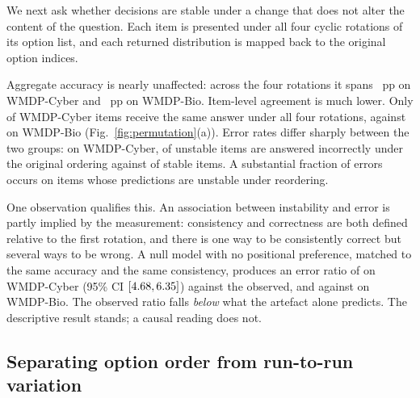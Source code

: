 \documentclass[conference,compsoc]{IEEEtran}
\begin{document}
We next ask whether decisions are stable under a change that does not alter the content of
the question. Each item is presented under all four cyclic rotations of its option list, and
each returned distribution is mapped back to the original option indices.

Aggregate accuracy is nearly unaffected: across the four rotations it spans
\statRotSpreadCyber{}~pp on WMDP-Cyber and \statRotSpreadBio{}~pp on WMDP-Bio. Item-level
agreement is much lower. Only \statConsistCyber{} of WMDP-Cyber items receive the same answer
under all four rotations, against \statConsistBio{} on WMDP-Bio
(Fig.~\ref{fig:permutation}(a)). Error rates differ sharply between the two groups: on
WMDP-Cyber, \statErrUnstableCyber{} of unstable items are answered incorrectly under the
original ordering against \statErrStableCyber{} of stable items. A substantial fraction of errors occurs on items whose predictions are unstable under
reordering.

One observation qualifies this. An association between instability and error is partly
implied by the measurement: consistency and correctness are both defined relative to the
first rotation, and there is one way to be consistently correct but several ways to be
wrong. A null model with no positional preference, matched to the same accuracy and the same
consistency, produces an error ratio of \statNullRatioCyber{} on WMDP-Cyber (95\% CI
$[4.68, 6.35]{}$) against the \statErrRatioCyber{} observed, and
\statNullRatioBio{} against \statErrRatioBio{} on WMDP-Bio. The observed ratio falls
\emph{below} what the artefact alone predicts. The descriptive result stands; a causal
reading does not.

\subsection{Separating option order from run-to-run variation}
\end{document}

